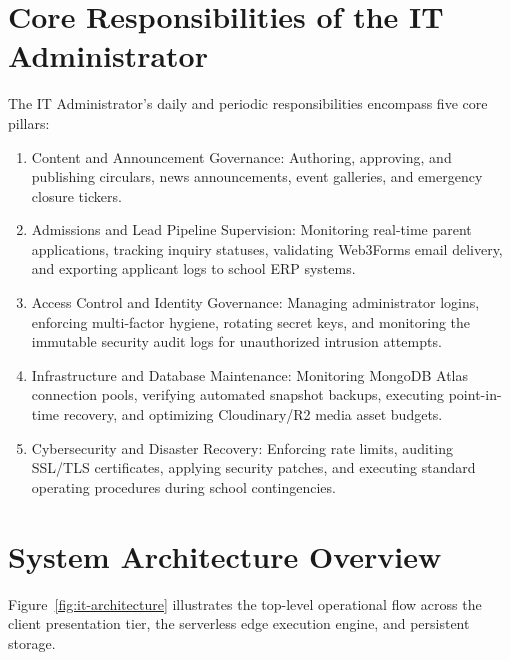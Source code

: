 \documentclass[11pt,a4paper,oneside]{report}
\def\textbf#1{#1}
\def\&{and}
\begin{document}
\section{Core Responsibilities of the IT Administrator}

The IT Administrator's daily and periodic responsibilities encompass five core pillars:

\begin{enumerate}[leftmargin=*]
  \item \textbf{Content \& Announcement Governance:} Authoring, approving, and publishing
        circulars, news announcements, event galleries, and emergency closure tickers.
  \item \textbf{Admissions \& Lead Pipeline Supervision:} Monitoring real-time parent
        applications, tracking inquiry statuses, validating Web3Forms email delivery,
        and exporting applicant logs to school ERP systems.
  \item \textbf{Access Control \& Identity Governance:} Managing administrator logins,
        enforcing multi-factor hygiene, rotating secret keys, and monitoring the
        immutable security audit logs for unauthorized intrusion attempts.
  \item \textbf{Infrastructure \& Database Maintenance:} Monitoring MongoDB Atlas connection
        pools, verifying automated snapshot backups, executing point-in-time recovery,
        and optimizing Cloudinary/R2 media asset budgets.
  \item \textbf{Cybersecurity \& Disaster Recovery:} Enforcing rate limits, auditing SSL/TLS
        certificates, applying security patches, and executing standard operating procedures
        during school contingencies.
\end{enumerate}

\section{System Architecture Overview}

Figure~\ref{fig:it-architecture} illustrates the top-level operational flow across the
client presentation tier, the serverless edge execution engine, and persistent storage.
\end{document}
